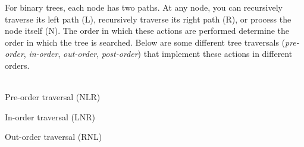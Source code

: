 For binary trees, each node has two paths. At any node, you can recursively traverse its left path (L), recursively traverse its right path (R), or process the node itself (N). The order in which these actions are performed determine the order in which the tree is searched. Below are some different tree traversals (\textit{pre-order}, \textit{in-order}, \textit{out-order}, \textit{post-order}) that implement these actions in different orders. \\\\

\begin{algorithm}[H]
    \caption{Pre-order traversal (NLR)}
\end{algorithm}
    \vspace{5mm}
     
\begin{algorithm}[H]
    \caption{In-order traversal (LNR)}
\end{algorithm}
\vspace{5mm}

\begin{algorithm}[H]
    \caption{Out-order traversal (RNL)}
\end{algorithm}
\vspace{5mm}

